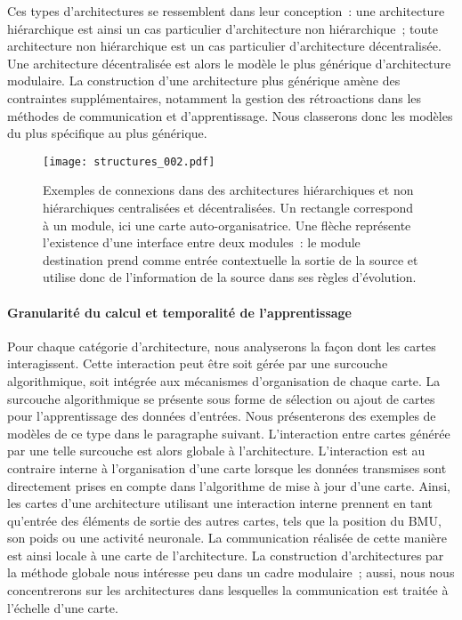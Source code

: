 \documentclass[../main]{subfiles}
\begin{document}
Ces types d'architectures se ressemblent dans leur conception~: une architecture hiérarchique est ainsi un cas particulier d'architecture non hiérarchique~; toute architecture non hiérarchique est un cas particulier d'architecture décentralisée. Une architecture décentralisée est alors le modèle le plus générique d'architecture modulaire.
La construction d'une architecture plus générique amène des contraintes supplémentaires, notamment la gestion des rétroactions dans les méthodes de communication et d'apprentissage.
Nous classerons donc les modèles du plus spécifique au plus générique.
\begin{figure}
    \centering\texttt{[image: structures\_002.pdf]}
    \caption{Exemples de connexions dans des architectures hiérarchiques et non hiérarchiques centralisées et décentralisées. Un rectangle correspond à un module, ici une carte auto-organisatrice. Une flèche représente l'existence d'une interface entre deux modules~: le module destination prend comme entrée contextuelle la sortie de la source et utilise donc de l'information de la source dans ses règles d'évolution. \label{fig:structure}}
    \end{figure}

\paragraph{Granularité du calcul et temporalité de l'apprentissage}

Pour chaque catégorie d'architecture, nous analyserons la façon dont les cartes interagissent.
Cette interaction peut être soit gérée par une surcouche algorithmique, soit intégrée aux mécanismes d'organisation de chaque carte.
La surcouche algorithmique se présente sous forme de sélection ou ajout de cartes pour l'apprentissage des données d'entrées.
Nous présenterons des exemples de modèles de ce type dans le paragraphe suivant. L'interaction entre cartes générée par une telle surcouche est alors globale à l'architecture.
L'interaction est au contraire interne à l'organisation d'une carte lorsque les données transmises sont directement prises en compte dans l'algorithme de mise à jour d'une carte. Ainsi, les cartes d'une architecture utilisant une interaction interne prennent en tant qu'entrée des éléments de sortie des autres cartes, tels que la position du BMU, son poids ou une activité neuronale. La communication réalisée de cette manière est ainsi locale à une carte de l'architecture. 
La construction d'architectures par la méthode globale nous intéresse peu dans un cadre modulaire~; aussi, nous nous concentrerons sur les architectures dans lesquelles la communication est traitée à l'échelle d'une carte.
\end{document}
